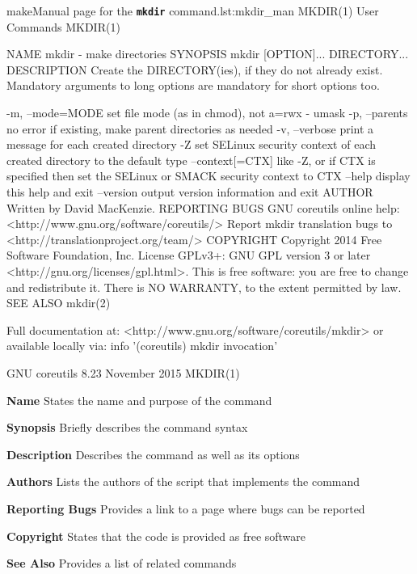 \begin{source_code_float}{make}{Manual page for the \textbf{\texttt{mkdir}} command.}{lst:mkdir_man}
  MKDIR(1)            User Commands               MKDIR(1)

  NAME
         mkdir - make directories
  SYNOPSIS
         mkdir [OPTION]... DIRECTORY...
  DESCRIPTION
         Create the DIRECTORY(ies), if they do not already exist.
         Mandatory arguments to long options are mandatory for short options too.

         -m, --mode=MODE
            set file mode (as in chmod), not a=rwx - umask
         -p, --parents
                no error if existing, make parent directories as needed
         -v, --verbose
                print a message for each created directory
         -Z     set SELinux security context of each created directory to the default type
         --context[=CTX]
                like -Z, or if CTX is specified then set the SELinux or SMACK security context to CTX
         --help   display this help and exit
         --version   output version information and exit
  AUTHOR
         Written by David MacKenzie.
  REPORTING BUGS
         GNU coreutils online help: <http://www.gnu.org/software/coreutils/>
         Report mkdir translation bugs to <http://translationproject.org/team/>
  COPYRIGHT
         Copyright 2014 Free Software Foundation, Inc.  License GPLv3+: GNU GPL version 3 or later <http://gnu.org/licenses/gpl.html>.
         This  is free software: you are free to change and redistribute it.  There is NO WARRANTY, to the extent permitted by law.
  SEE ALSO    mkdir(2)

         Full documentation at: <http://www.gnu.org/software/coreutils/mkdir> or available locally via: info '(coreutils) mkdir invocation'

  GNU coreutils 8.23    November 2015    MKDIR(1)\end{source_code_float}

\begin{description}
\item{\textbf{Name}} States the name and purpose of the command
\item{\textbf{Synopsis}} Briefly describes the command syntax
\item{\textbf{Description}} Describes the command as well as its options
\item{\textbf{Authors}} Lists the authors of the script that implements the command
\item{\textbf{Reporting Bugs}} Provides a link to a page where bugs can be reported
\item{\textbf{Copyright}} States that the code is provided as free software
\item{\textbf{See Also}} Provides a list of related commands
\end{description}

